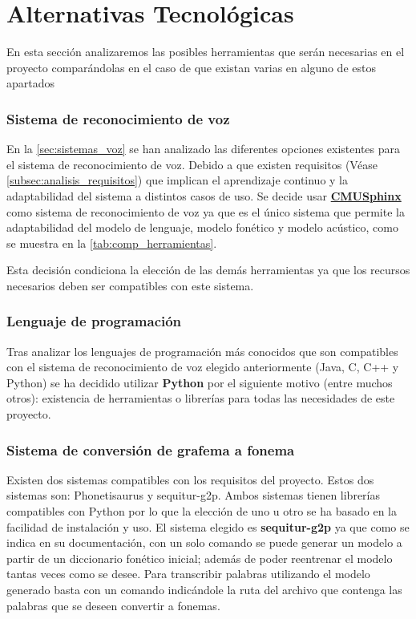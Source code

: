 \documentclass[../main.tex]{subfiles}
\begin{document}
\section{Alternativas Tecnológicas}

En esta sección analizaremos las posibles herramientas que serán necesarias en el proyecto comparándolas en el caso de que existan varias en alguno de estos apartados

\subsubsection{Sistema de reconocimiento de voz}\label{subsub:at-cmu}
En la \autoref{sec:sistemas_voz} se han analizado las diferentes opciones existentes para el sistema de reconocimiento de voz. Debido a que existen requisitos (Véase \autoref{subsec:analisis_requisitos}) que implican el aprendizaje continuo y la adaptabilidad del sistema a distintos casos de uso. Se decide usar \hyperref[par:cmusphinx]{\textbf{CMUSphinx}}\cite{Lamere2003a} como sistema de reconocimiento de voz ya que es el único sistema que permite la adaptabilidad del modelo de lenguaje, modelo fonético y modelo acústico, como se muestra en la \autoref{tab:comp_herramientas}. 

Esta decisión condiciona la elección de las demás herramientas ya que los recursos necesarios deben ser compatibles con este sistema.

\subsubsection{Lenguaje de programación}\label{subsub:at-python}
Tras analizar los lenguajes de programación más conocidos que son compatibles con el sistema de reconocimiento de voz elegido anteriormente (Java, C, C++ y Python) se ha decidido utilizar \textbf{Python} por el siguiente motivo (entre muchos otros): existencia de herramientas o librerías para todas las necesidades de este proyecto. 

\subsubsection{Sistema de conversión de grafema a fonema}\label{subsub:at-g2p}
Existen dos sistemas compatibles con los requisitos del proyecto. Estos dos sistemas son: Phonetisaurus\cite{NOVAK2016a} y sequitur-g2p\cite{Bisani2008}. Ambos sistemas tienen librerías compatibles con Python por lo que la elección de uno u otro se ha basado en la facilidad de instalación y uso. El sistema elegido es \textbf{sequitur-g2p} ya que como se indica en su documentación, con un solo comando se puede generar un modelo a partir de un diccionario fonético inicial; además de poder reentrenar el modelo tantas veces como se desee. Para transcribir palabras utilizando el modelo generado basta con un comando indicándole la ruta del archivo que contenga las palabras que se deseen convertir a fonemas.
\end{document}

